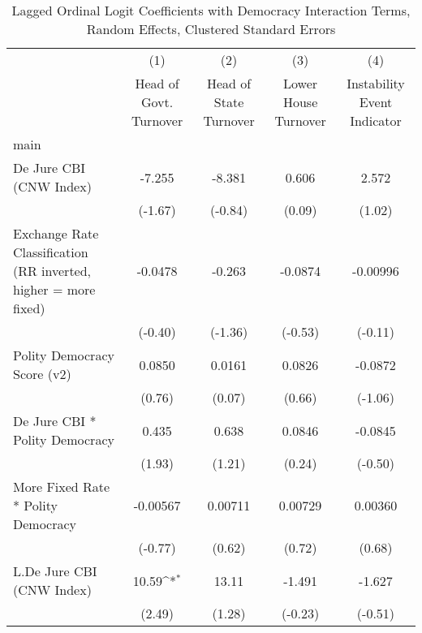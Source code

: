{
\def\sym#1{\ifmmode^{#1}\else\(^{#1}\)\fi}
\begin{longtable}{l*{4}{c}}
\caption{Lagged Ordinal Logit Coefficients with Democracy Interaction Terms, Random Effects, Clustered Standard Errors \label{demintlagordLogLogDJ}}\\
\hline\hline\endfirsthead\hline\endhead\hline\endfoot\endlastfoot
                &\multicolumn{1}{c}{(1)}&\multicolumn{1}{c}{(2)}&\multicolumn{1}{c}{(3)}&\multicolumn{1}{c}{(4)}\\
                &\multicolumn{1}{c}{Head of Govt. Turnover}&\multicolumn{1}{c}{Head of State Turnover}&\multicolumn{1}{c}{Lower House Turnover}&\multicolumn{1}{c}{Instability Event Indicator}\\
\hline
main            &                  &                  &                  &                  \\
De Jure CBI (CNW Index)&   -7.255         &   -8.381         &    0.606         &    2.572         \\
                &  (-1.67)         &  (-0.84)         &   (0.09)         &   (1.02)         \\
[1em]
Exchange Rate Classification (RR inverted, higher = more fixed)&  -0.0478         &   -0.263         &  -0.0874         & -0.00996         \\
                &  (-0.40)         &  (-1.36)         &  (-0.53)         &  (-0.11)         \\
[1em]
Polity Democracy Score (v2)&   0.0850         &   0.0161         &   0.0826         &  -0.0872         \\
                &   (0.76)         &   (0.07)         &   (0.66)         &  (-1.06)         \\
[1em]
De Jure CBI * Polity Democracy&    0.435         &    0.638         &   0.0846         &  -0.0845         \\
                &   (1.93)         &   (1.21)         &   (0.24)         &  (-0.50)         \\
[1em]
More Fixed Rate * Polity Democracy& -0.00567         &  0.00711         &  0.00729         &  0.00360         \\
                &  (-0.77)         &   (0.62)         &   (0.72)         &   (0.68)         \\
[1em]
L.De Jure CBI (CNW Index)&    10.59\sym{*}  &    13.11         &   -1.491         &   -1.627         \\
                &   (2.49)         &   (1.28)         &  (-0.23)         &  (-0.51)         \\

\end{longtable}}

